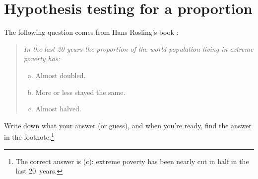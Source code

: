 \section{Hypothesis testing for a proportion}
\label{hypothesisTesting}



The following question comes from Hans Rosling's book
\emph{}:
\begin{quote}{\em
  In the last 20 years the proportion of the
  world population living in extreme poverty has:
  \begin{enumerate}[a.]
  \item Almost doubled.
  \item More or less stayed the same.
  \item Almost halved.
  \end{enumerate}
}\end{quote}
Write down what your answer (or guess),
and when you're ready, find the answer in the
footnote.\footnote{The correct answer is (c):
extreme poverty has been nearly cut in half in the last 20~years.}

